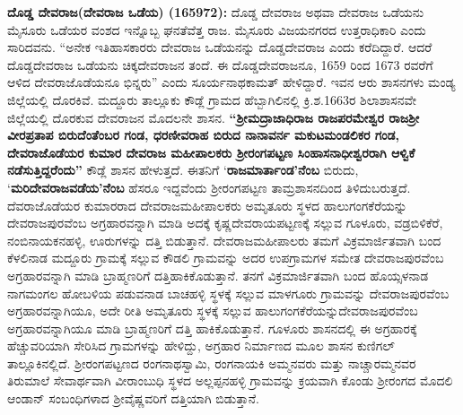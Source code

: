 \textbf{ ದೊಡ್ಡ ದೇವರಾಜ(ದೇವರಾಜ ಒಡೆಯ) (165972):} ದೊಡ್ಡ ದೇವರಾಜ ಅಥವಾ ದೇವರಾಜ ಒಡೆಯನು ಮೈಸೂರು ಒಡೆಯರ ವಂಶದ ಇನ್ನೊಬ್ಬ ಘನತೆವೆತ್ತ ರಾಜ. ಮೈಸೂರು ವಿಜಯನಗರದ ಉತ್ತರಾಧಿಕಾರಿ ಎಂದು ಸಾರಿದವನು. “ಅನೇಕ ಇತಿಹಾಸಕಾರರು ದೇವರಾಜ ಒಡೆಯನನ್ನು ದೊಡ್ಡದೇವರಾಜ ಎಂದು ಕರೆದಿದ್ದಾರೆ. ಆದರೆ ದೊಡ್ಡದೇವರಾಜ ಒಡೆಯನು ಚಿಕ್ಕದೇವರಾಜನ ತಂದೆ. ಈ ದೊಡ್ಡದೇವರಾಜನೂ, 1659 ರಿಂದ 1673 ರವರೆಗೆ ಆಳಿದ ದೇವರಾಜೊಡೆಯನೂ ಭಿನ್ನರು” ಎಂದು ಸೂರ್ಯನಾಥಕಾಮತ್​ ಹೇಳಿದ್ದಾರೆ. ಇವನ ಆರು ಶಾಸನಗಳು ಮಂಡ್ಯ ಜಿಲ್ಲೆಯಲ್ಲಿ ದೊರಕಿವೆ. ಮದ್ದೂರು ತಾಲ್ಲೂಕು ಕೌಡ್ಲೆ ಗ್ರಾಮದ ಹೆಬ್ಬಾಗಿಲಿನಲ್ಲಿ ಕ್ರಿ.ಶ.1663ರ ಶಿಲಾಶಾಸನವೇ ಜಿಲ್ಲೆಯಲ್ಲಿ ದೊರಕುವ ದೇವರಾಜನ ಮೊದಲನೇ ಶಾಸನ. \textbf{“ಶ‍್ರೀಮದ್ರಾಜಾಧಿರಾಜ ರಾಜಪರಮೇಶ್ವರ ರಾಜಶ‍್ರೀ ವೀರಪ್ರತಾಪ ಬಿರುದೆಂತೆಂಬರ ಗಂಡ, ಧರಣೀವರಾಹ ಬಿರುದ ನಾನಾವರ್ನ ಮಕುಟಮಂಡಲಿಕರ ಗಂಡ, ದೇವರಾಜೊಡೆಯರ ಕುಮಾರ ದೇವರಾಜ ಮಹೀಪಾಲಕರು ಶ‍್ರೀರಂಗಪಟ್ಟಣ ಸಿಂಹಾಸನಾಧೀಶ್ವರರಾಗಿ ಆಳ್ವಿಕೆ ನಡೆಸುತ್ತಿದ್ದರೆಂದು”} ಕೌಡ್ಲೆ ಶಾಸನ ಹೇಳುತ್ತದೆ. ಈತನಿಗೆ ‘\textbf{ರಾಜಮಾರ್ತಾಂಡ’ನೆಂಬ} ಬಿರುದು, ‘\textbf{ಮರಿದೇವರಾಜವಡೆಯ’ನೆಂಬ} ಹೆಸರೂ ಇದ್ದವೆಂದು ಶ‍್ರೀರಂಗಪಟ್ಟಣ ತಾಮ್ರಶಾಸನದಿಂದ ತಿಳಿದುಬರುತ್ತದೆ. ದೆವರಾಜೊಡೆಯರ ಕುಮಾರರಾದ ದೇವರಾಜಮಹೀಪಾಲಕರು ಅಮೃತೂರು ಸ್ಥಳದ ಹಾಲುಗಂಗಕೆರೆಯನ್ನು ದೇವರಾಜಪುರವೆಂಬ ಅಗ್ರಹಾರವನ್ನಾಗಿ ಮಾಡಿ ಅದಕ್ಕೆ ಕೃಷ್ಣದೇವರಾಯಪಟ್ಟಣಕ್ಕೆ ಸಲ್ಲುವ ಗೂಳೂರು, ವಡ್ರಬಿಳಿಕೆರೆ, ನಂಬಿನಾಯಕನಹಳ್ಳಿ, ಊರುಗಳನ್ನು ದತ್ತಿ ಬಿಡುತ್ತಾನೆ. ದೇವರಾಜಮಹೀಪಾಲರು ತಮಗೆ ವಿಕ್ರಮಾರ್ಜಿತವಾಗಿ ಬಂದ ಕೆಳಲಿನಾಡ ಮದ್ದೂರು ಗ್ರಾಮಕ್ಕೆ ಸಲ್ಲುವ ಕೌಡಲಿ ಗ್ರಾಮವನ್ನು ಅದರ ಉಪಗ್ರಾಮಗಳ ಸಮೇತ ದೇವರಾಜಪುರವೆಂಬ ಅಗ್ರಹಾರವನ್ನಾಗಿ ಮಾಡಿ ಬ್ರಾಹ್ಮಣರಿಗೆ ದತ್ತಿಹಾಕಿಕೊಡುತ್ತಾನೆ. ತನಗೆ ವಿಕ್ರಮಾರ್ಜಿತವಾಗಿ ಬಂದ ಹೊಯ್ಸಳನಾಡ ನಾಗಮಂಗಲ ಹೋಬಳಿಯ ಪಡುವನಾಡ ಬಾಚಹಳ್ಳಿ ಸ್ಥಳಕ್ಕೆ ಸಲ್ಲುವ ಮಾಳಗೂರು ಗ್ರಾಮವನ್ನು ದೇವರಾಜಪುರವೆಂಬ ಅಗ್ರಹಾರವನ್ನಾಗಿಯೂ, ಅದೇ ರೀತಿ ಅಮೃತೂರು ಸ್ಥಳಕ್ಕೆ ಸಲ್ಲುವ ಹಾಲುಗಂಗಕೆರೆಯನ್ನು\break ದೇವರಾಜಪುರವೆಂಬ ಅಗ್ರಹಾರವನ್ನಾಗಿಯೂ ಮಾಡಿ ಬ್ರಾಹ್ಮಣರಿಗೆ ದತ್ತಿ ಹಾಕಿಕೊಡುತ್ತಾನೆ. ಗೂಳೂರು ಶಾಸನದಲ್ಲಿ ಈ ಅಗ್ರಹಾರಕ್ಕೆ ಹೆಚ್ಚುವರಿಯಾಗಿ ಸೇರಿಸಿದ ಗ್ರಾಮಗಳನ್ನು ಹೇಳಿದ್ದು, ಅಗ್ರಹಾರ ನಿರ್ಮಾಣದ ಮೂಲ ಶಾಸನ ಕುಣಿಗಲ್​ ತಾಲ್ಲೂಕಿನಲ್ಲಿದೆ. ಶ‍್ರೀರಂಗಪಟ್ಟಣದ ರಂಗನಾಥಸ್ವಾಮಿ, ರಂಗನಾಯಕಿ ಅಮ್ಮನವರು ಮತ್ತು ನಾಚ್ಚಾರಮ್ಮನವರ ತಿರುಮಾಲೆ ಸೇವಾರ್ಥವಾಗಿ ವೀರಾಂಬುಧಿ ಸ್ಥಳದ ಅಲ್ಲಪ್ಪನಹಳ್ಳಿ ಗ್ರಾಮವನ್ನು ಕ್ರಯವಾಗಿ ಕೊಂಡು ಶ‍್ರೀರಂಗದ ಮೊದಲಿ ಆಂಡಾನ್​ ಸಂಬಂಧಿಗಳಾದ ಶ‍್ರೀವೈಷ್ಣವರಿಗೆ ದತ್ತಿಯಾಗಿ ಬಿಡುತ್ತಾನೆ.

